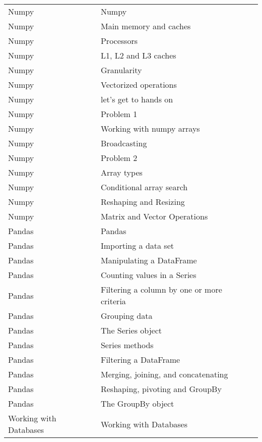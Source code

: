 \documentclass[10pt,a4paper]{article}
\begin{document}
\begin{landscape}
\begin{longtable}{|l|l|l|}
Numpy & Numpy & \cite{mayer2020oneliners} \\
    Numpy & Main memory and caches & \cite{herlihy20211} \\
    Numpy & Processors & \cite{herlihy20211} \\
    Numpy & L1, L2 and L3 caches & \cite{robey2021parallel} \\
    Numpy & Granularity & \cite{herlihy20211} \\
    Numpy & Vectorized operations & \cite{robey2021parallel} \\
    Numpy & let's get to hands on & \cite{mayer2020oneliners} \\
    Numpy & Problem 1 & \cite{mayer2020oneliners} \\
    Numpy & Working with numpy arrays & \cite{mayer2020oneliners} \\
    Numpy & Broadcasting & \cite{mayer2020oneliners} \\
    Numpy & Problem 2 & \cite{mayer2020oneliners} \\
    Numpy & Array types & \cite{mayer2020oneliners} \\
    Numpy & Conditional array search & \cite{mayer2020oneliners} \\
    Numpy & Reshaping and Resizing & \cite{johansson10numerical} \\
    Numpy & Matrix and Vector Operations & \cite{johansson10numerical} \\
    
Pandas & Pandas & \cite{paskhaver2021pandas} \\
    Pandas & Importing a data set & \cite{paskhaver2021pandas} \\
    Pandas & Manipulating a DataFrame & \cite{paskhaver2021pandas} \\
    Pandas & Counting values in a Series & \cite{paskhaver2021pandas} \\
    Pandas & Filtering a column by one or more criteria & \cite{paskhaver2021pandas} \\
    Pandas & Grouping data & \cite{paskhaver2021pandas} \\
    Pandas & The Series object & \cite{paskhaver2021pandas} \\
    Pandas & Series methods & \cite{paskhaver2021pandas} \\
    Pandas & Filtering a DataFrame & \cite{paskhaver2021pandas} \\
    Pandas & Merging, joining, and concatenating & \cite{paskhaver2021pandas} \\
    Pandas & Reshaping, pivoting and GroupBy & \cite{paskhaver2021pandas} \\
    Pandas & The GroupBy object & \cite{paskhaver2021pandas} \\
    
Working with Databases & Working with Databases & \cite{vasiliev2020pythondatascience} \\
    

\end{longtable}
\end{landscape}

\restoregeometry


\end{document}
